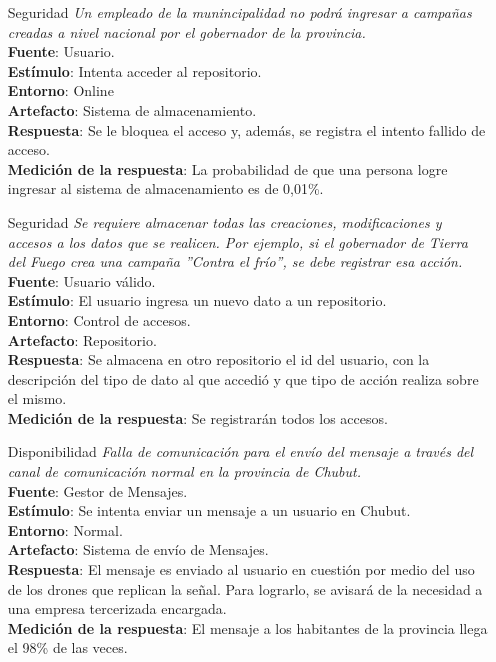 \documentclass[a4paper, 11pt]{article}
\begin{document}
\begin{itemize}
\item[Seguridad] \textit{Un empleado de la munincipalidad no podrá ingresar a campañas creadas a nivel nacional por el gobernador de la provincia.}\\
\textbf{Fuente}: Usuario.\\
\textbf{Estímulo}: Intenta acceder al repositorio. \\
\textbf{Entorno}: Online \\
\textbf{Artefacto}: Sistema de almacenamiento. \\
\textbf{Respuesta}: Se le bloquea el acceso y, además, se registra el intento fallido de acceso. \\
\textbf{Medición de la respuesta}: La probabilidad de que una persona logre ingresar al sistema de almacenamiento es de 0,01\%. \\

\item[Seguridad] \textit{Se requiere almacenar todas las creaciones, modificaciones y accesos a los datos que se realicen. Por ejemplo, si el gobernador de Tierra del Fuego crea una campaña ''Contra el frío'', se debe registrar esa acción. }\\
\textbf{Fuente}: Usuario válido.\\
\textbf{Estímulo}: El usuario ingresa un nuevo dato a un repositorio.\\
\textbf{Entorno}: Control de accesos.\\
\textbf{Artefacto}: Repositorio.\\
\textbf{Respuesta}: Se almacena en otro repositorio el id del usuario, con la descripción del tipo de dato al que accedió y que tipo de acción realiza sobre el mismo.\\
\textbf{Medición de la respuesta}: Se registrarán todos los accesos.\\

\item[Disponibilidad] \textit{Falla de comunicación para el envío del mensaje a través del canal de comunicación normal en la provincia de Chubut.}\\
\textbf{Fuente}: Gestor de Mensajes. \\
\textbf{Estímulo}: Se intenta enviar un mensaje a un usuario en Chubut. \\
\textbf{Entorno}: Normal. \\
\textbf{Artefacto}: Sistema de env\'io de Mensajes. \\
\textbf{Respuesta}: El mensaje es enviado al usuario en cuesti\'on por medio del uso de los drones que replican la señal. Para lograrlo, se avisará de la necesidad a una empresa tercerizada encargada. \\
\textbf{Medición de la respuesta}: El mensaje a los habitantes de la provincia llega el 98\% de las veces. \\



\end{itemize}
\end{document}
